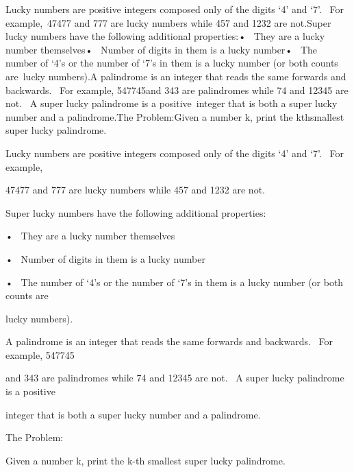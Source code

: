 Lucky numbers are positive integers composed only of the digits ‘4’ and ‘7’.  For example, 47477 and 777 are lucky numbers while 457 and 1232 are not.Super lucky numbers have the following additional properties:•  They are a lucky number themselves•  Number of digits in them is a lucky number•  The number of ‘4’s or the number of ‘7’s in them is a lucky number (or both counts are lucky numbers).A palindrome is an integer that reads the same forwards and backwards.  For example, 547745and 343 are palindromes while 74 and 12345 are not.  A super lucky palindrome is a positive integer that is both a super lucky number and a palindrome.The Problem:Given a number k, print the kthsmallest super lucky palindrome.

Lucky numbers are positive integers composed only of the digits ‘4’ and ‘7’.  For example, 

47477 and 777 are lucky numbers while 457 and 1232 are not.

Super lucky numbers have the following additional properties:

•  They are a lucky number themselves

•  Number of digits in them is a lucky number

•  The number of ‘4’s or the number of ‘7’s in them is a lucky number (or both counts are 

lucky numbers).

A palindrome is an integer that reads the same forwards and backwards.  For example, 547745

and 343 are palindromes while 74 and 12345 are not.  A super lucky palindrome is a positive 

integer that is both a super lucky number and a palindrome.

The Problem:

Given a number k, print the k-th smallest super lucky palindrome.